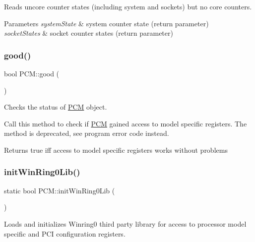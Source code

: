 Reads uncore counter states (including system and sockets) but no core counters. 


\begin{DoxyParams}{Parameters}
{\em system\+State} & system counter state (return parameter) \\
\hline
{\em socket\+States} & socket counter states (return parameter) \\
\hline
\end{DoxyParams}
\mbox{\label{class_p_c_m_a56eedaa84893f72b1723f8d580ee3329}} 
\subsubsection{\texorpdfstring{good()}{good()}}
{\footnotesize\ttfamily bool P\+C\+M\+::good (\begin{DoxyParamCaption}{ }\end{DoxyParamCaption})}



Checks the status of \mbox{\hyperlink{class_p_c_m}{P\+CM}} object. 

Call this method to check if \mbox{\hyperlink{class_p_c_m}{P\+CM}} gained access to model specific registers. The method is deprecated, see program error code instead.

\begin{DoxyReturn}{Returns}
true iff access to model specific registers works without problems 
\end{DoxyReturn}
\mbox{\label{class_p_c_m_a5e4cabfe4223f1d2e7e1e0da8b1179b3}} 
\subsubsection{\texorpdfstring{init\+Win\+Ring0\+Lib()}{initWinRing0Lib()}}
{\footnotesize\ttfamily static bool P\+C\+M\+::init\+Win\+Ring0\+Lib (\begin{DoxyParamCaption}{ }\end{DoxyParamCaption})\hspace{0.3cm}{\ttfamily [static]}}



Loads and initializes Winring0 third party library for access to processor model specific and P\+CI configuration registers. 

